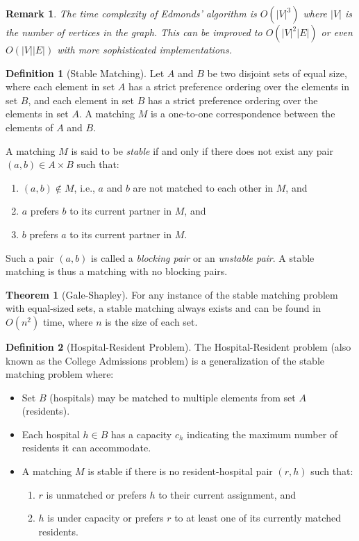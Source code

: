 \documentclass{article}
\newtheorem{remark}{Remark}
\theoremstyle{definition}
\newtheorem{theorem}{Theorem}
\newtheorem{definition}{Definition}
\begin{document}
\begin{remark}
    The time complexity of Edmonds' algorithm is $O(|V|^3)$ where $|V|$ is the number of vertices in the graph. This can be improved to $O(|V|^2|E|)$ or even $O(|V||E|)$ with more sophisticated implementations.
\end{remark}

\begin{definition}[Stable Matching]
Let $A$ and $B$ be two disjoint sets of equal size, where each element in set $A$ has a strict preference ordering over the elements in set $B$, and each element in set $B$ has a strict preference ordering over the elements in set $A$. A matching $M$ is a one-to-one correspondence between the elements of $A$ and $B$.

A matching $M$ is said to be \textit{stable} if and only if there does not exist any pair $(a, b) \in A \times B$ such that:
\begin{enumerate}
  \item $(a, b) \notin M$, i.e., $a$ and $b$ are not matched to each other in $M$, and
  \item $a$ prefers $b$ to its current partner in $M$, and
  \item $b$ prefers $a$ to its current partner in $M$.
\end{enumerate}

Such a pair $(a, b)$ is called a \textit{blocking pair} or an \textit{unstable pair}. A stable matching is thus a matching with no blocking pairs.
\end{definition}

\begin{theorem}[Gale-Shapley]
For any instance of the stable matching problem with equal-sized sets, a stable matching always exists and can be found in $O(n^2)$ time, where $n$ is the size of each set.
\end{theorem}

\begin{definition}[Hospital-Resident Problem]
The Hospital-Resident problem (also known as the College Admissions problem) is a generalization of the stable matching problem where:
\begin{itemize}
  \item Set $B$ (hospitals) may be matched to multiple elements from set $A$ (residents).
  \item Each hospital $h \in B$ has a capacity $c_h$ indicating the maximum number of residents it can accommodate.
  \item A matching $M$ is stable if there is no resident-hospital pair $(r, h)$ such that:
  \begin{enumerate}
    \item $r$ is unmatched or prefers $h$ to their current assignment, and
    \item $h$ is under capacity or prefers $r$ to at least one of its currently matched residents.
  \end{enumerate}
\end{itemize}
\end{definition}
\end{document}
